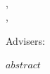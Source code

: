 \frontmatter
\maketitle

\makeatletter
\begin{doublespacing}
\thispagestyle{empty}
\begin{center}
\MakeUppercase{\thetitle}\\[.5\baselineskip]
\theauthor, \nu@degreeabbreviation\\
\nu@university, \nu@year
\end{center}
\begin{flushleft}
Advisers: \unladviserabstract
\end{flushleft}
$abstract$
\par
\end{doublespacing}
\makeatother
\cleardoublepage
